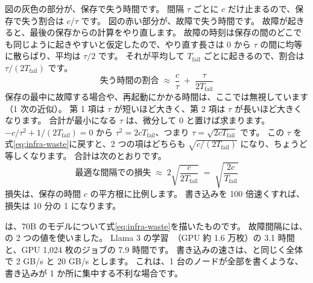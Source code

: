 図の灰色の部分が、保存で失う時間です。
間隔 $\tau$ ごとに $c$ だけ止まるので、保存で失う割合は $c/\tau$ です。
図の赤い部分が、故障で失う時間です。
故障が起きると、最後の保存からの計算をやり直します。
故障の時刻は保存の間のどこでも同じように起きやすいと仮定したので、やり直す長さは 0 から $\tau$ の間に均等に散らばり、平均は $\tau/2$ です。
それが平均して $T_{\mathrm{fail}}$ ごとに起きるので、割合は $\tau/(2T_{\mathrm{fail}})$ です。
\begin{equation}
\text{失う時間の割合} \;\approx\; \frac{c}{\tau} \;+\; \frac{\tau}{2T_{\mathrm{fail}}}
\label{eq:infra-waste}
\end{equation}
保存の最中に故障する場合や、再起動にかかる時間は、ここでは無視しています（1 次の近似）。
第 1 項は $\tau$ が短いほど大きく、第 2 項は $\tau$ が長いほど大きくなります。
合計が最小になる $\tau$ は、微分して 0 と置けば求まります。
$-c/\tau^{2}+1/(2T_{\mathrm{fail}})=0$ から $\tau^{2}=2cT_{\mathrm{fail}}$、つまり $\tau=\sqrt{2cT_{\mathrm{fail}}}$ です。
この $\tau$ を式\eqref{eq:infra-waste}に戻すと、2 つの項はどちらも $\sqrt{c/(2T_{\mathrm{fail}})}$ になり、ちょうど等しくなります。
合計は次のとおりです。
\begin{equation}
\text{最適な間隔での損失} \;\approx\; 2\sqrt{\frac{c}{2T_{\mathrm{fail}}}} \;=\; \sqrt{\frac{2c}{T_{\mathrm{fail}}}}
\label{eq:infra-waste-min}
\end{equation}
損失は、保存の時間 $c$ の平方根に比例します。
書き込みを 100 倍速くすれば、損失は 10 分の 1 になります。

は、70B のモデルについて式\eqref{eq:infra-waste}を描いたものです。
故障間隔には、の 2 つの値を使いました。
Llama 3 の学習~\cite{dubey2024llama3}（GPU 約 1.6 万枚）の 3.1 時間と、GPU 1,024 枚のジョブの 7.9 時間です。
書き込みの速さは、と同じく全体で 2 GB/s と 20 GB/s とします。
これは、1 台のノードが全部を書くような、書き込みが 1 か所に集中する不利な場合です。

